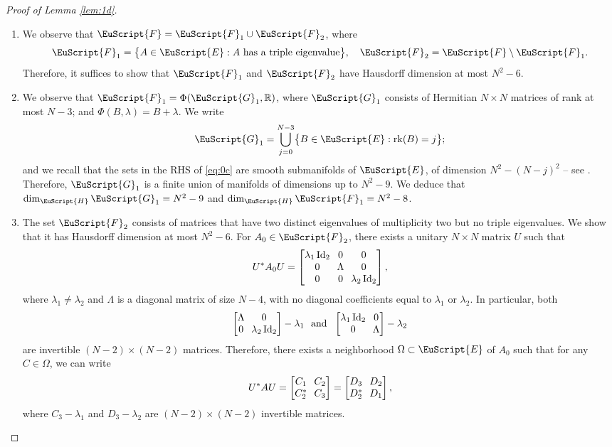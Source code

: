 \documentclass[JEP,XML,SOM,Unicode,NoFloatCountersInSection]{cedram}
\let\pazocal\EuScript
\let\sep:
\theoremstyle{definition}
\DeclareMathOperator{\Id}{Id}
\DeclareMathOperator{\rk}{rk}
\newcommand{\FF}{\pazocal{F}}
\newcommand{\GG}{\pazocal{G}}
\newcommand{\EE}{\pazocal{E}}
\newcommand{\HH}{\pazocal{H}}
\newcommand{\R}{\mathbb{R}}
\newcommand{\matrice}[1]{\arraycolsep3.5pt\begin{bmatrix}#1\end{bmatrix}}
\begin{document}
\skpt
\begin{proof}[Proof of Lemma \ref{lem:1d}]
\begin{enumerate}
\item
We observe that $\FF= \FF_1 \cup \FF_2$, where
\begin{equation*}
\FF_1 = \bigl\{A \in \EE \sep \text{$A$ has a triple eigenvalue} \bigr\}, \quad
\FF_2 = \FF \setminus \FF_1.
\end{equation*}
Therefore, it suffices to show that $\FF_1$ and $\FF_2$ have Hausdorff dimension at most $N^2-6$.

\item
We observe that $\FF_1 = \Phi(\GG_1,\R)$, where $\GG_1$ consists of Hermitian $N \times N$ matrices of rank at most $N-3$; and $\Phi(B,\lambda) = B+\lambda$. We write
\begin{equation}\label{eq:0c}
\GG_1 = \bigcup_{j=0}^{N-3} \bigl\{ B \in \EE \sep \rk(B) = j\bigr\};
\end{equation}
and we recall that the sets in the RHS of \eqref{eq:0c} are smooth submanifolds of $\EE$, of dimension $N^2-(N-j)^2$ -- see \eg \cite[\S1.4]{GP74}. Therefore, $\GG_1$ is a finite union of manifolds of dimensions up to $N^2-9$. We deduce that $\dim_{\HH}\GG_1 = N^2-9$ and $\dim_\HH \FF_1 = N^2-8$.

\item
The set $\FF_2$ consists of matrices that have two distinct eigenvalues of multiplicity two but no triple eigenvalues.
We show that it has Hausdorff dimension at most $N^2-6$. For $A_0 \in \FF_2$, there exists a unitary $N \times N$ matrix $U$ such that
\begin{equation*}
U^* A_0 U= \matrice{\lambda_1 \Id_2 & 0 & 0 \\ 0 & \Lambda & 0 \\ 0 & 0 & \lambda_2 \Id_2},
\end{equation*}
where $\lambda_1 \neq \lambda_2$ and $\Lambda$ is a diagonal matrix of size $N-4$, with no diagonal coefficients equal to $\lambda_1$ or $\lambda_2$. In particular, both
\begin{equation*}
\matrice{\Lambda & 0 \\ 0 & \lambda_2 \Id_2} - \lambda_1 \ \ \text{and} \ \ \matrice{\lambda_1 \Id_2 & 0 \\ 0 & \Lambda } - \lambda_2
\end{equation*}
are invertible $(N-2) \times (N-2)$ matrices. Therefore, there exists a neighborhood $\Omega \subset \EE$ of $A_0$ such that for any $C \in \Omega$, we can write
\begin{equation*}
U^* A U = \matrice{C_1 & C_2 \\ C_2^* & C_3} = \matrice{D_3 & D_2 \\ D_2^* & D_1} ,
\end{equation*}
where $C_3 - \lambda_1$ and $D_3-\lambda_2$ are $(N-2) \times (N-2)$ invertible matrices.


\end{enumerate}
\end{proof}
\end{document}
